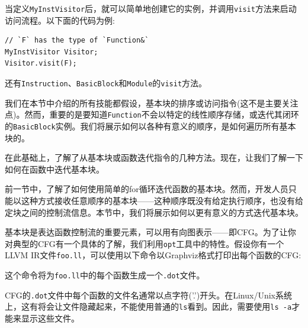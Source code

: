 当定义\texttt{MyInstVisitor}后，就可以简单地创建它的实例，并调用\texttt{visit}方法来启动访问流程。以下面的代码为例:

\begin{lstlisting}[style=styleCXX]
// `F` has the type of `Function&`
MyInstVisitor Visitor;
Visitor.visit(F);
\end{lstlisting}

还有\texttt{Instruction}、\texttt{BasicBlock}和\texttt{Module}的\texttt{visit}方法。

\begin{tcolorbox}[colback=blue!5!white,colframe=blue!75!black, fonttitle=\bfseries,title=基本块和指令的排序]	
\hspace*{0.7cm}我们在本节中介绍的所有技能都假设，基本块的排序或访问指令(这不是主要关注点)。然而，重要的是要知道\texttt{Function}不会以特定的线性顺序存储，或迭代其闭环的\texttt{BasicBlock}实例。我们将展示如何以各种有意义的顺序，是如何遍历所有基本块的。
\end{tcolorbox}

在此基础上，了解了从基本块或函数迭代指令的几种方法。现在，让我们了解一下如何在函数中迭代基本块。


前一节中，了解了如何使用简单的for循环迭代函数的基本块。然而，开发人员只能以这种方式接收任意顺序的基本块——这种顺序既没有给定执行顺序，也没有给定块之间的控制流信息。本节中，我们将展示如何以更有意义的方式迭代基本块。

基本块是表达函数控制流的重要元素，可以用有向图表示——即CFG。为了让你对典型的CFG有一个具体的了解，我们利用\texttt{opt}工具中的特性。假设你有一个LLVM IR文件\texttt{foo.ll}，可以使用以下命令以Graphviz格式打印出每个函数的CFG:


这个命令将为\texttt{foo.ll}中的每个函数生成一个\texttt{.dot}文件。

\begin{tcolorbox}[colback=blue!5!white,colframe=blue!75!black, fonttitle=\bfseries,title=.dot文件可能会被隐藏]	
\hspace*{0.7cm}CFG的\texttt{.dot}文件中每个函数的文件名通常以点字符('.')开头。在Linux/Unix系统上，这有将会让文件隐藏起来，不能使用普通的\texttt{ls}看到。因此，需要使用\texttt{ls -a}才能来显示这些文件。
\end{tcolorbox}

